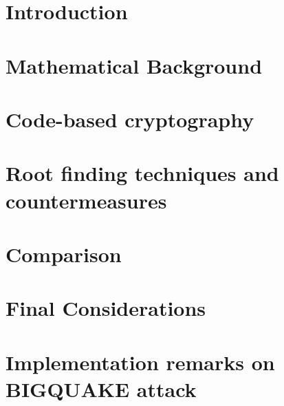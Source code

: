 \documentclass[brazil, english]{ufsc-thesis}
\begin{document}


\textual

\chapter{Introduction}
\label{ch:intro}


% 

\chapter{Mathematical Background}
\label{ch:math}


\chapter{Code-based cryptography}
\label{ch:code-based}


\chapter{Root finding techniques and countermeasures}
\label{ch:roots}


\chapter{Comparison}
\label{ch:comparison}


\chapter{Final Considerations}
\label{ch:final}



\postextual


\appendix
\chapter{Implementation remarks on BIGQUAKE attack}\label{ch:imp-remarks}

\end{document}
